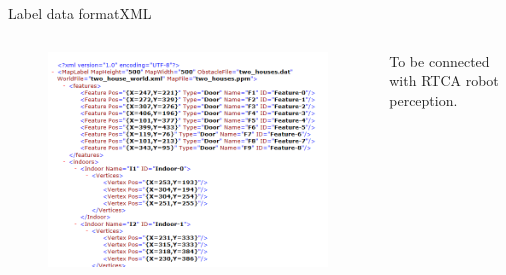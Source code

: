 \begin{frame}{Label data format}{XML}

\begin{columns}
\begin{figure}
\centering
\includegraphics[width = \textwidth]{./screenshot/label_data_xml.png}
\end{figure}

\begin{minipage}{\textwidth}
To be connected with RTCA robot perception.
\end{minipage}
\end{columns}

\end{frame}